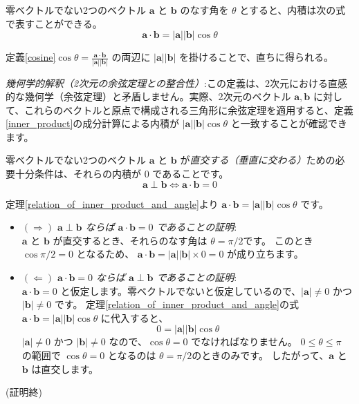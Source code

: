 \begin{thm}[内積とベクトルのなす角の関係] \label{relation_of_inner_product_and_angle}
零ベクトルでない2つのベクトル $\bm{a}$ と $\bm{b}$ のなす角を $\theta$ とすると、内積は次の式で表すことができる。
\[\bm{a} \cdot \bm{b} = |\bm{a}| |\bm{b}| \cos\theta\]
\begin{proof*}
定義\ref{cosine}$\cos\theta = \frac{\bm{a} \cdot \bm{b}}{|\bm{a}| |\bm{b}|}$ の両辺に $|\bm{a}| |\bm{b}|$ を掛けることで、直ちに得られる。
\end{proof*}
\end{thm}

\emph{幾何学的解釈（2次元の余弦定理との整合性）}:この定義は、2次元における直感的な幾何学（余弦定理）と矛盾しません。実際、2次元のベクトル $\bm{a}, \bm{b}$ に対して、これらのベクトルと原点で構成される三角形に余弦定理を適用すると、定義\ref{inner_product}の成分計算による内積が $|\bm{a}||\bm{b}|\cos\theta$ と一致することが確認できます。

\begin{thm}[ベクトルの直交条件] \label{orthogonality_condition}
零ベクトルでない2つのベクトル $\bm{a}$ と $\bm{b}$ が\emph{直交する（垂直に交わる）}ための必要十分条件は、それらの内積が $0$ であることです。
\[\bm{a} \perp \bm{b} \iff \bm{a} \cdot \bm{b} = 0\]
\begin{proof*}
定理\ref{relation_of_inner_product_and_angle}より $\bm{a} \cdot \bm{b} = |\bm{a}| |\bm{b}| \cos\theta$ です。
\begin{itemize}
\item \emph{$(\Rightarrow)$ $\bm{a} \perp \bm{b}$ ならば $\bm{a} \cdot \bm{b} = 0$ であることの証明}:\\
    $\bm{a}$ と $\bm{b}$ が直交するとき、それらのなす角は $\theta = \pi/2$です。
    このとき $\cos \pi/2 = 0$ となるため、
    $\bm{a} \cdot \bm{b} = |\bm{a}| |\bm{b}| \times 0 = 0$
    が成り立ちます。
\item \emph{$(\Leftarrow)$ $\bm{a} \cdot \bm{b} = 0$ ならば $\bm{a} \perp \bm{b}$ であることの証明}:\\
    $\bm{a} \cdot \bm{b} = 0$ と仮定します。零ベクトルでないと仮定しているので、$|\bm{a}| \neq 0$ かつ $|\bm{b}| \neq 0$ です。
    定理\ref{relation_of_inner_product_and_angle}の式 $\bm{a} \cdot \bm{b} = |\bm{a}| |\bm{b}| \cos\theta$ に代入すると、
    \[0 = |\bm{a}| |\bm{b}| \cos\theta\]
    $|\bm{a}| \neq 0$ かつ $|\bm{b}| \neq 0$ なので、$\cos\theta = 0$ でなければなりません。
    $0 \le \theta \le \pi$ の範囲で $\cos\theta = 0$ となるのは $\theta = \pi/2$のときのみです。
    したがって、$\bm{a}$ と $\bm{b}$ は直交します。
\end{itemize}
(証明終)
\end{proof*}
\end{thm}

